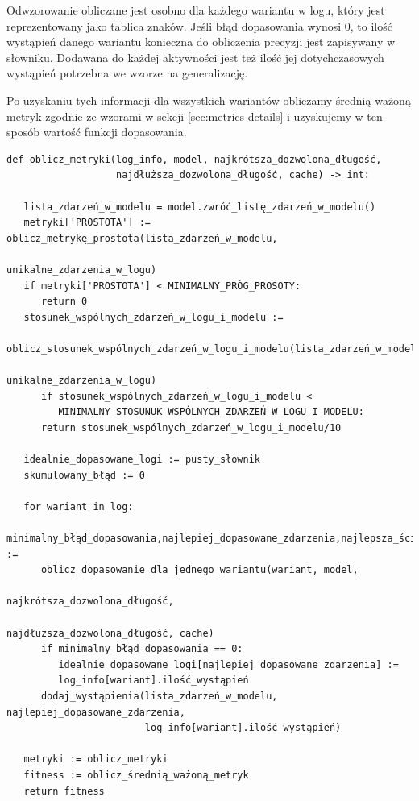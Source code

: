 Odwzorowanie obliczane jest osobno dla każdego wariantu w logu, który jest reprezentowany jako tablica znaków. Jeśli błąd dopasowania wynosi 0, to ilość wystąpień danego wariantu konieczna do obliczenia precyzji jest zapisywany w słowniku. Dodawana do każdej aktywności jest też ilość jej dotychczasowych wystąpień potrzebna we wzorze na generalizację.

Po uzyskaniu tych informacji dla wszystkich wariantów obliczamy średnią ważoną metryk zgodnie ze wzorami w sekcji \ref{sec:metrics-details} i uzyskujemy w ten sposób wartość funkcji dopasowania.

\lstset{caption=Obliczanie metryk, captionpos=b}
\lstset{label=src:best_result, frame=single}
\begin{lstlisting}[escapeinside=``]
def oblicz_metryki(log_info, model, najkrótsza_dozwolona_długość, 
                   najdłuższa_dozwolona_długość, cache) -> int:
                   
   lista_zdarzeń_w_modelu = model.zwróć_listę_zdarzeń_w_modelu()
   metryki['PROSTOTA'] := oblicz_metrykę_prostota(lista_zdarzeń_w_modelu, 
                                                  unikalne_zdarzenia_w_logu)
   if metryki['PROSTOTA'] < MINIMALNY_PRÓG_PROSOTY:
      return 0
   stosunek_wspólnych_zdarzeń_w_logu_i_modelu := 
      oblicz_stosunek_wspólnych_zdarzeń_w_logu_i_modelu(lista_zdarzeń_w_modelu, 
                                                        unikalne_zdarzenia_w_logu)		   
      if stosunek_wspólnych_zdarzeń_w_logu_i_modelu <
         MINIMALNY_STOSUNUK_WSPÓLNYCH_ZDARZEŃ_W_LOGU_I_MODELU:
      return stosunek_wspólnych_zdarzeń_w_logu_i_modelu/10
        
   idealnie_dopasowane_logi := pusty_słownik
   skumulowany_błąd := 0
    
   for wariant in log:
      minimalny_błąd_dopasowania,najlepiej_dopasowane_zdarzenia,najlepsza_ścieżka := 
      oblicz_dopasowanie_dla_jednego_wariantu(wariant, model, 
                                              najkrótsza_dozwolona_długość, 
                                              najdłuższa_dozwolona_długość, cache)
      if minimalny_błąd_dopasowania == 0:
         idealnie_dopasowane_logi[najlepiej_dopasowane_zdarzenia] := 
         log_info[wariant].ilość_wystąpień
      dodaj_wystąpienia(lista_zdarzeń_w_modelu, najlepiej_dopasowane_zdarzenia, 
                        log_info[wariant].ilość_wystąpień)

   metryki := oblicz_metryki 
   fitness := oblicz_średnią_ważoną_metryk
   return fitness
\end{lstlisting}

